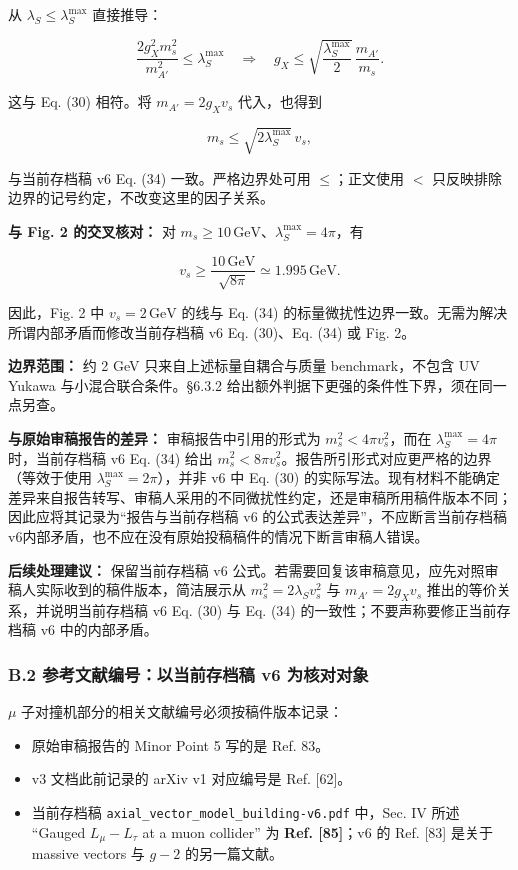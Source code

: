 \documentclass[
  chinese,
  UTF8]{ctexart}
\providecommand{\tightlist}{%
  \setlength{\itemsep}{0pt}\setlength{\parskip}{0pt}}
\begin{document}
从 \(\lambda_S\leq\lambda_S^{\max}\) 直接推导：

\[
\frac{2g_X^2m_s^2}{m_{A'}^2}\leq\lambda_S^{\max}
\quad\Longrightarrow\quad
 g_X\leq\sqrt{\frac{\lambda_S^{\max}}{2}}\,\frac{m_{A'}}{m_s}.
\]

这与 Eq. (30) 相符。将 \(m_{A'}=2g_Xv_s\) 代入，也得到

\[
 m_s\leq\sqrt{2\lambda_S^{\max}}\,v_s,
\tag{34}
\]

与当前存档稿 v6 Eq. (34) 一致。严格边界处可用 \(\leq\)；正文使用 \(<\)
只反映排除边界的记号约定，不改变这里的因子关系。

\textbf{与 Fig. 2 的交叉核对：} 对
\(m_s\geq10\,\mathrm{GeV}\)、\(\lambda_S^{\max}=4\pi\)，有

\[
 v_s\geq\frac{10\,\mathrm{GeV}}{\sqrt{8\pi}}\simeq1.995\,\mathrm{GeV}.
\]

因此，Fig. 2 中 \(v_s=2\,\mathrm{GeV}\) 的线与 Eq. (34)
的标量微扰性边界一致。无需为解决所谓内部矛盾而修改当前存档稿 v6 Eq.
(30)、Eq. (34) 或 Fig. 2。

\textbf{边界范围：} 约 2 GeV 只来自上述标量自耦合与质量
benchmark，不包含 UV Yukawa 与小混合联合条件。§6.3.2
给出额外判据下更强的条件性下界，须在同一点另查。

\textbf{与原始审稿报告的差异：} 审稿报告中引用的形式为
\(m_s^2<4\pi v_s^2\)，而在 \(\lambda_S^{\max}=4\pi\) 时，当前存档稿 v6
Eq. (34) 给出
\(m_s^2<8\pi v_s^2\)。报告所引形式对应更严格的边界（等效于使用
\(\lambda_S^{\max}=2\pi\)），并非 v6 中 Eq. (30)
的实际写法。现有材料不能确定差异来自报告转写、审稿人采用的不同微扰性约定，还是审稿所用稿件版本不同；因此应将其记录为``报告与当前存档稿
v6 的公式表达差异''，不应断言当前存档稿
v6内部矛盾，也不应在没有原始投稿稿件的情况下断言审稿人错误。

\textbf{后续处理建议：} 保留当前存档稿 v6
公式。若需要回复该审稿意见，应先对照审稿人实际收到的稿件版本，简洁展示从
\(m_s^2=2\lambda_Sv_s^2\) 与 \(m_{A'}=2g_Xv_s\)
推出的等价关系，并说明当前存档稿 v6 Eq. (30) 与 Eq. (34)
的一致性；不要声称要修正当前存档稿 v6 中的内部矛盾。

\subsubsection{B.2 参考文献编号：以当前存档稿 v6
为核对对象}\label{b.2-ux53c2ux8003ux6587ux732eux7f16ux53f7ux4ee5ux5f53ux524dux5b58ux6863ux7a3f-v6-ux4e3aux6838ux5bf9ux5bf9ux8c61}

\ensuremath{\mu} 子对撞机部分的相关文献编号必须按稿件版本记录：

\begin{itemize}
\tightlist
\item
  原始审稿报告的 Minor Point 5 写的是 Ref. 83。
\item
  v3 文档此前记录的 arXiv v1 对应编号是 Ref. {[}62{]}。
\item
  当前存档稿 \texttt{axial\_vector\_model\_building-v6.pdf} 中，Sec. IV
  所述 ``Gauged \(L_\mu-L_\tau\) at a muon collider'' 为 \textbf{Ref.
  {[}85{]}}；v6 的 Ref. {[}83{]} 是关于 massive vectors 与 \(g-2\)
  的另一篇文献。
\end{itemize}
\end{document}
